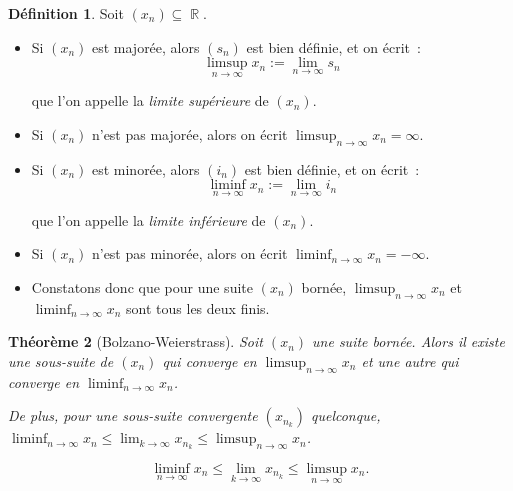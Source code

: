 \documentclass{article}
\DeclareMathOperator{\R}{\mathbb R}
\newtheorem{thm}{Théorème}[section]
\theoremstyle{definition}
\newtheorem{déf}[thm]{Définition}
\theoremstyle{remark}
\begin{document}
		\begin{déf} Soit $(x_n) \subseteq \R$.

		\begin{itemize}
			\item Si $(x_n)$ est majorée, alors $(s_n)$ est bien définie, et on écrit~:
			\[\limsup_{n\to\infty}x_n := \lim_{n\to\infty}s_n\]

			que l'on appelle la \textit{limite supérieure} de $(x_n)$.

			\item Si $(x_n)$ n'est pas majorée, alors on écrit $\limsup_{n\to\infty}x_n = \infty$.

			\item Si $(x_n)$ est minorée, alors $(i_n)$ est bien définie, et on écrit~:
			\[\liminf_{n\to\infty}x_n := \lim_{n\to\infty}i_n\]

			que l'on appelle la \textit{limite inférieure} de $(x_n)$.

			\item Si $(x_n)$ n'est pas minorée, alors on écrit $\liminf_{n\to\infty}x_n = -\infty$.

			\item Constatons donc que pour une suite $(x_n)$ bornée, $\limsup_{n\to\infty}x_n$ et $\liminf_{n\to\infty}x_n$ sont tous les deux finis.
		\end{itemize}
		\end{déf}

		\begin{thm}[Bolzano-Weierstrass]\label{thm:BolzWeieR} Soit $(x_n)$ une suite bornée. Alors il existe une sous-suite de $(x_n)$ qui converge en
		$\limsup_{n\to\infty}x_n$ et une autre qui converge en $\liminf_{n\to\infty}x_n$.

		De plus, pour une sous-suite convergente $(x_{n_k})$ quelconque, $\liminf_{n \to \infty}x_n \leq \lim_{k\to\infty}x_{n_k} \leq \limsup_{n\to\infty}x_n$.

		\[\liminf_{n\to\infty}x_n \leq \lim_{k\to\infty}x_{n_k} \leq \limsup_{n\to\infty}x_n.\]
		\end{thm}
\end{document}
